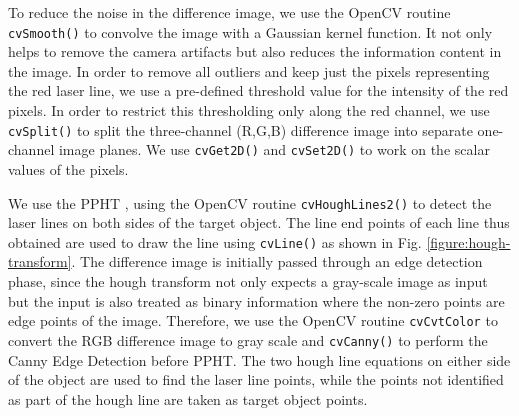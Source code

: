 To reduce the noise in the difference image, we use the OpenCV routine
\texttt{cvSmooth()} to convolve the image with a Gaussian kernel function. It
not only helps to remove the camera artifacts but also reduces the information
content in the image. In order to remove all outliers and keep just the pixels
representing the red laser line, we use a pre-defined threshold value for the
intensity of the red pixels. In order to restrict this thresholding only along
the red channel, we use \texttt{cvSplit()} to split the three-channel (R,G,B)
difference image into separate one-channel image planes. We use
\texttt{cvGet2D()} and \texttt{cvSet2D()} to work on the scalar values of the
pixels.



We use the \ac{PPHT} \cite{kiryati:1991}, \cite{matas:2000} using the OpenCV
routine \texttt{cvHoughLines2()} to detect the laser lines on both sides of
the target object. The line end points of each line thus obtained are used to
draw the line using \texttt{cvLine()} as shown in Fig.
\ref{figure:hough-transform}.  The difference image is initially passed
through an edge detection phase, since the hough transform not only expects a
gray-scale image as input but the input is also treated as binary information
where the non-zero points are edge points of the image. Therefore, we use the
OpenCV routine \texttt{cvCvtColor} to convert the RGB difference image to gray
scale and \texttt{cvCanny()} to perform the Canny Edge Detection
\cite{canny:1986} before \ac{PPHT}. The two hough line equations on either
side of the object are used to find the laser line points, while the points
not identified as part of the hough line are taken as target object points.

